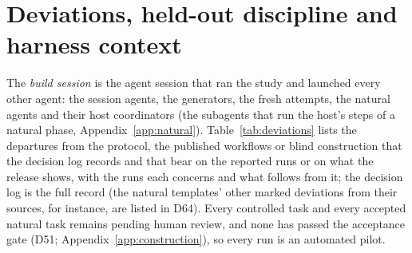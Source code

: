 \section{Deviations, held-out discipline and harness context}
\label{app:deviations}\label{sec:deviations}
The \emph{build session} is the agent session that ran the study and launched every other agent: the session agents,
the generators, the fresh attempts, the natural agents and their host coordinators (the subagents that run the host's
steps of a natural phase, Appendix~\ref{app:natural}). Table~\ref{tab:deviations} lists the
departures from the protocol, the published workflows or blind construction that the decision log records and that bear
on the reported runs or on what the release shows, with the runs each concerns and what follows from it; the decision
log is the full record (the natural templates' other marked deviations from their sources, for instance, are listed in
D64). Every controlled task and every accepted natural task remains pending
human review, and none has passed the acceptance gate (D51; Appendix~\ref{app:construction}), so every run is an
automated pilot.

